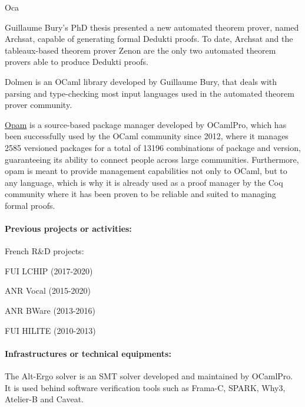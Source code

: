 \begin{sitedescription}{Oca}
\begin{compactitem}
\item Guillaume Bury's PhD thesis presented a new automated theorem
  prover, named Archsat, capable of generating formal Dedukti proofs. To date,
  Archsat and the tableaux-based theorem prover Zenon are the only two automated
  theorem provers able to produce Dedukti proofs.
\item Dolmen is an OCaml library developed by Guillaume Bury,
  that deals with parsing and type-checking most input languages used in
  the automated theorem prover community.
\item \href{https://opam.ocaml.org/}{Opam} is a source-based package manager developed by OCamlPro,
  which has been successfully used by the OCaml community since 2012, where
  it manages 2585 versioned packages for a total of 13196 combinations of package
  and version, guaranteeing its ability to connect people across large communities.
  Furthermore, opam is meant to provide management capabilities not only to
  OCaml, but to any language, which is why it is already used as a proof manager
  by the Coq community where it has been proven to be reliable and suited to
  managing formal proofs.
\end{compactitem}

\paragraph*{Previous projects or activities:}

French R\&D projects:
\begin{compactitem}
\item FUI LCHIP (2017-2020)
\item ANR Vocal (2015-2020)
\item ANR BWare (2013-2016)
\item FUI HILITE (2010-2013)
\end{compactitem}

\paragraph*{Infrastructures or technical equipments:}

\begin{compactitem}
\item The Alt-Ergo solver\cite{ae2.2} is an SMT solver developed and
  maintained by OCamlPro. It is used behind software verification tools
  such as Frama-C, SPARK, Why3, Atelier-B and Caveat.
\end{compactitem}


\end{sitedescription}

